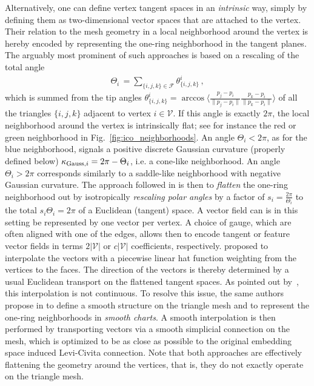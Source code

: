 Alternatively, one can define vertex tangent spaces in an \emph{intrinsic} way, simply by defining them as two-dimensional vector spaces that are attached to the vertex.
Their relation to the mesh geometry in a local neighborhood around the vertex is hereby encoded by representing the one-ring neighborhood in the tangent planes.
The arguably most prominent of such approaches is based on a rescaling of the total angle
\begin{align}\label{eq:mesh_total_incident_angle}
    \Theta_i \,=\! \sum_{\{i,j,k\}\in\mathcal{F}} \theta_{\{i,j,k\}}^i \,,
\end{align}
which is summed from the tip angles
$\theta_{\{i,j,k\}}^i = \arccos \big\langle \frac{p_j-p_i}{\lVert p_j-p_i\rVert} \frac{p_k-p_i}{\lVert p_k-p_i\rVert} \big\rangle$
of all the triangles $\{i,j,k\}$ adjacent to vertex $i\in\mathcal{V}$.
If this angle is exactly $2\pi$, the local neighborhood around the vertex is intrinsically flat; see for instance the red or green neighborhood in Fig.~\ref{fig:ico_neighborhoods}.
An angle $\Theta_i < 2\pi$, as for the blue neighborhood, signals a positive discrete Gaussian curvature (properly defined below) $\kappa_{\textup{Gauss},i} = 2\pi - \Theta_i$, i.e. a cone-like neighborhood.
An angle $\Theta_i > 2\pi$ corresponds similarly to a saddle-like neighborhood with negative Gaussian curvature.
The approach followed in
\cite{polthier1998straightest,zhang2006vectorFieldDesign,Knoppel:2013:GOD,Sharp2019VectorHeatMethod,craneDiscreteDifferentialGeometry2014}
is then to \emph{flatten} the one-ring neighborhood out by isotropically \emph{rescaling polar angles} by a factor of $s_i = \frac{2\pi}{\Theta_i}$ to the total $s_i \Theta_i = 2\pi$ of a Euclidean (tangent) space.
A vector field can is in this setting be represented by one vector per vertex.
A choice of gauge, which are often aligned with one of the edges, allows then to encode tangent or feature vector fields in terms $2|\mathcal{V}|$ or $c|\mathcal{V}|$ coefficients, respectively.
\citet{zhang2006vectorFieldDesign} proposed to interpolate the vectors with a piecewise linear hat function weighting from the vertices to the faces.
The direction of the vectors is thereby determined by a usual Euclidean transport on the flattened tangent spaces.
As pointed out by~\citet{deGoes2016VectorFieldProcessing}, this interpolation is not continuous.
To resolve this issue, the same authors propose in \cite{liu2016discreteConnection} to define a smooth structure on the triangle mesh and to represent the one-ring neighborhoods in \emph{smooth charts}.
A smooth interpolation is then performed by transporting vectors via a smooth simplicial connection on the mesh, which is optimized to be as close as possible to the original embedding space induced Levi-Civita connection.
Note that both approaches are effectively flattening the geometry around the vertices, that is, they do not exactly operate on the triangle mesh.


